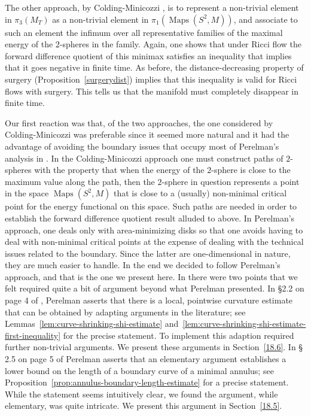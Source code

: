The other approach, by Colding-Minicozzi \cite{ColdingMinicozzi}, is
to represent a non-trivial element in $\pi_3(M_T)$ as a non-trivial
element in $\pi_1(\operatorname{Maps}(S^2,M))$, and associate to such an
element the infimum over all representative families of the maximal
energy of the $2$-spheres in the family. Again, one shows that under
Ricci flow the forward difference quotient of this minimax satisfies
an inequality that implies that it goes negative in finite time. As
before, the distance-decreasing property of surgery
(Proposition~\ref{surgerydist}) implies that this inequality is
valid for Ricci flows with surgery. This tells us that the manifold
must completely disappear in finite time.




Our first reaction was that, of the two approaches, the one
considered by Colding-Minicozzi was preferable since it seemed more
natural and it had the advantage of avoiding the boundary issues
that occupy most of Perelman's analysis in \cite{Perelman3}.
 In the Colding-Minicozzi approach one must construct paths of $2$-spheres with the
 property that when the energy of the $2$-sphere is close to the
 maximum value along the path, then the $2$-sphere in question
 represents a point in the space $\operatorname{Maps}(S^2,M)$ that is
 close to a (usually) non-minimal critical point for the energy
 functional on this space. Such paths are needed in order to
 establish the forward difference quotient result alluded to above.
In Perelman's approach, one deals only with area-minimizing disks so
that one avoids having to deal with non-minimal critical points at
the expense of dealing with the technical issues related to the
boundary. Since the latter are one-dimensional in nature, they are
much easier to handle. In the end we decided to follow Perelman's
approach, and that is the one we present here.  In \cite{Perelman3}
there were two points that we felt required quite a bit of argument
beyond what Perelman presented. In \S 2.2 on page 4 of
\cite{Perelman3}, Perelman asserts that there is a local, pointwise
curvature estimate that can be obtained by adapting arguments in the
literature; see Lemmas~\ref{lem:curve-shrinking-shi-estimate} and~\ref{lem:curve-shrinking-shi-estimate-first-inequality} for the precise
statement. To implement this adaption required further non-trivial
arguments. We present these arguments in Section~\ref{18.6}. In \S
2.5 on page 5 of \cite{Perelman3} Perelman asserts that an
elementary argument establishes a lower bound on the length of a
boundary curve of a minimal annulus; see
Proposition~\ref{prop:annulus-boundary-length-estimate} for a precise statement. While the
statement seems intuitively clear, we found the argument, while
elementary, was quite intricate. We present this argument in
Section~\ref{18.5}.

